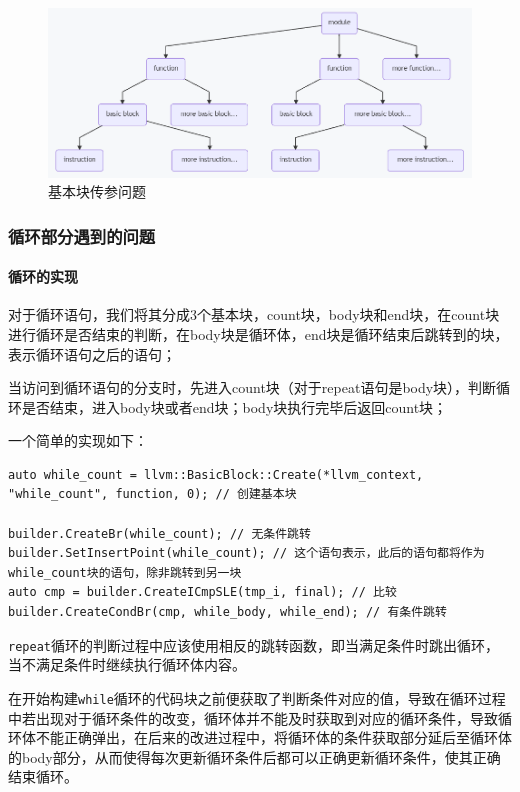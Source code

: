 \documentclass[lang=cn,11pt,a4paper,cite=authornum]{paper}
\begin{document}
\begin{figure}[htbp]
    \centering
    \includegraphics[width=\linewidth]{./Images/BBfunc.png}
    \caption{基本块传参问题\label{fig:BBfunc}}
\end{figure}

\subsubsection{循环部分遇到的问题}

\paragraph{循环的实现}

对于循环语句，我们将其分成3个基本块，count块，body块和end块，在count块进行循环是否结束的判断，在body块是循环体，end块是循环结束后跳转到的块，表示循环语句之后的语句；

当访问到循环语句的分支时，先进入count块（对于repeat语句是body块），判断循环是否结束，进入body块或者end块；body块执行完毕后返回count块；

一个简单的实现如下：

\begin{code}
    \begin{verbatim}
auto while_count = llvm::BasicBlock::Create(*llvm_context, "while_count", function, 0); // 创建基本块

builder.CreateBr(while_count); // 无条件跳转
builder.SetInsertPoint(while_count); // 这个语句表示，此后的语句都将作为while_count块的语句，除非跳转到另一块
auto cmp = builder.CreateICmpSLE(tmp_i, final); // 比较
builder.CreateCondBr(cmp, while_body, while_end); // 有条件跳转
\end{verbatim}
\end{code}

\texttt{repeat}循环的判断过程中应该使用相反的跳转函数，即当满足条件时跳出循环，当不满足条件时继续执行循环体内容。

在开始构建\texttt{while}循环的代码块之前便获取了判断条件对应的值，导致在循环过程中若出现对于循环条件的改变，循环体并不能及时获取到对应的循环条件，导致循环体不能正确弹出，在后来的改进过程中，将循环体的条件获取部分延后至循环体的body部分，从而使得每次更新循环条件后都可以正确更新循环条件，使其正确结束循环。
\end{document}

